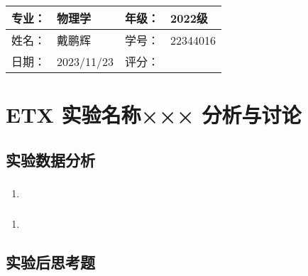 \documentclass[dvipsnames, svgnames,a4paper,11pt]{article}
\begin{document}
	\begin{table}
		\renewcommand\arraystretch{1.7}
		\begin{tabularx}{\textwidth}{|X|X|X|X|}
			\hline
			专业：& 物理学 &年级：& 2022级\\
			\hline
			姓名： & 戴鹏辉 & 学号：& 22344016\\
			\hline
			日期：& 2023/11/23 & 评分： &\\
			\hline
		\end{tabularx}
	\end{table}
	
	\section{ETX 实验名称××× \quad\heiti 分析与讨论}
	
	\subsection{实验数据分析}
	
	\subsubsection{}
	\begin{enumerate}
		\item 
	\end{enumerate}
	
	\subsubsection{}
	\begin{enumerate}
		\item 
	\end{enumerate}
	
	\subsubsection{}
	
	
	\subsection{实验后思考题}
	
	\begin{question}
		
	\end{question}
	
\end{document}
